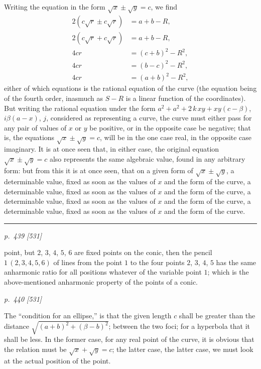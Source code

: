 \documentclass[11pt,a4paper]{article}
\theoremstyle{plain}
\theoremstyle{definition}
\begin{document}
Writing the equation in the form $\sqrt{x} \pm \sqrt{y} = c$, we find
\begin{align*}
2(c\sqrt{r} \pm c\sqrt{r}) &= a + b - R,\\
2(c\sqrt{r} + c\sqrt{r}) &= a + b - R,\\
4cr &= (c + b)^2 - R^2,\\
4cr &= (b - c)^2 - R^2,\\
4cr &= (a + b)^2 - R^2,
\end{align*}
either of which equations is the rational equation of the curve (the equation being of the fourth order, inasmuch as $S - R$ is a linear function of the coordinates). But writing the rational equation under the form $a^2 + a^2 + 2\,k\,xy + xy(c - \beta)$, $i\beta(a - x)$, $j$, considered as representing a curve, the curve must either pass for any pair of values of $x$ or $y$ be positive, or in the opposite case be negative; that is, the equations $\sqrt{x} \pm \sqrt{y} = c$, will be in the one case real, in the opposite case imaginary. It is at once seen that, in either case, the original equation $\sqrt{x} \pm \sqrt{y} = c$ also represents the same algebraic value, found in any arbitrary form: but from this it is at once seen, that on a given form of $\sqrt{x} \pm \sqrt{y}$, a determinable value, fixed as soon as the values of $x$ and the form of the curve, a determinable value, fixed as soon as the values of $x$ and the form of the curve, a determinable value, fixed as soon as the values of $x$ and the form of the curve, a determinable value, fixed as soon as the values of $x$ and the form of the curve.

\smallskip
\hrule
\smallskip
{}

\clearpage

\bigskip
\textit{p.~439 [531]}
\smallskip

\noindent
point, but $2$, $3$, $4$, $5$, $6$ are fixed points on the conic, then the pencil $1\,(2, 3, 4, 5, 6)$ of lines from the point $1$ to the four points $2$, $3$, $4$, $5$ has the same anharmonic ratio for all
positions whatever of the variable point $1$; which is the above-mentioned anharmonic
property of the points of a conic.


\clearpage

\bigskip
\textit{p.~440 [531]}
\smallskip

The ``condition for an ellipse,'' is that the given length $c$ shall be greater than the
distance $\sqrt{(a + b)^2 + (\beta - b)^2}$; between the two foci; for a hyperbola that it shall be
less. In the former case, for any real point of the curve, it is obvious that the
relation must be $\sqrt{x} + \sqrt{y} = c$; the latter case, the latter case, we must look at the actual position of the point.
\end{document}
